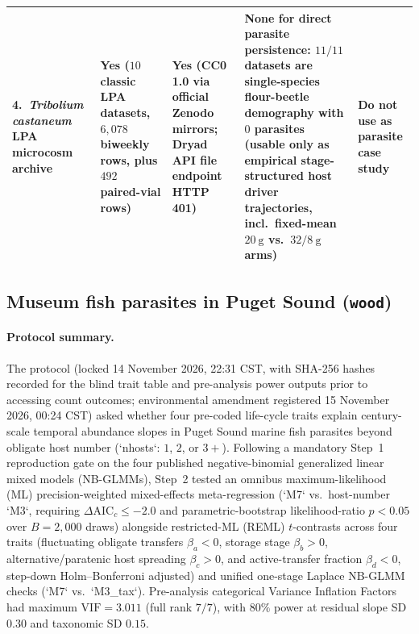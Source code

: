 \begin{table}[htbp]
{\begin{tabular}{@{}p{}p{}p{}p{}p{}@{}}
4.\ \textit{Tribolium castaneum} LPA microcosm archive \citep[Dryad \texttt{doi:10.5061/dryad.qjq2bvqmp}, Zenodo \texttt{7972066} and \texttt{4976742};][]{desharnais2023} & Yes ($10$ classic LPA datasets, $6{,}078$ biweekly rows, plus $492$ paired-vial rows) & Yes (CC0 1.0 via official Zenodo mirrors; Dryad API file endpoint HTTP 401) & None for direct parasite persistence: $11/11$ datasets are single-species flour-beetle demography with $0$ parasites (usable only as empirical stage-structured host driver trajectories, incl.\ fixed-mean $20\ \mathrm{g}$ vs.\ $32/8\ \mathrm{g}$ arms) & Do not use as parasite case study \\
\bottomrule
\end{tabular}}
\end{table}

\subsection{Museum fish parasites in Puget Sound (\texttt{wood})}\label{num-esm-wood}

\paragraph{Protocol summary.}
The protocol (locked 14 November 2026, 22:31 CST, with SHA-256 hashes recorded for the blind trait table and pre-analysis power outputs prior to accessing count outcomes; environmental amendment registered 15 November 2026, 00:24 CST) asked whether four pre-coded life-cycle traits explain century-scale temporal abundance slopes in Puget Sound marine fish parasites beyond obligate host number (`nhosts`: $1$, $2$, or $3+$). Following a mandatory Step~1 reproduction gate on the four published negative-binomial generalized linear mixed models (NB-GLMMs), Step~2 tested an omnibus maximum-likelihood (ML) precision-weighted mixed-effects meta-regression (`M7` vs.\ host-number `M3`, requiring $\Delta\mathrm{AIC}_c \le -2.0$ and parametric-bootstrap likelihood-ratio $p < 0.05$ over $B = 2{,}000$ draws) alongside restricted-ML (REML) $t$-contrasts across four traits (fluctuating obligate transfers $\beta_a < 0$, storage stage $\beta_b > 0$, alternative/paratenic host spreading $\beta_c > 0$, and active-transfer fraction $\beta_d < 0$, step-down Holm--Bonferroni adjusted) and unified one-stage Laplace NB-GLMM checks (`M7` vs.\ `M3\_tax`). Pre-analysis categorical Variance Inflation Factors had maximum $\mathrm{VIF} = 3.011$ (full rank $7/7$), with $80\%$ power at residual slope SD $0.30$ and taxonomic SD $0.15$.

